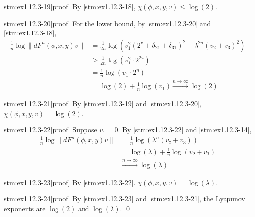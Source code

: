 \begin{stm}{stm:ex1.12.3-19}[proof]
By \ref{stm:ex1.12.3-18}, $\chi(\phi, x, y, v) \le \log(2)$.
\end{stm}

\begin{stm}{stm:ex1.12.3-20}[proof]
For the lower bound, by \ref{stm:ex1.12.3-20} and \ref{stm:ex1.12.3-18},
\begin{align*}
\frac{1}{n} \log \| dF^n(\phi, x, y)v \| 
&= \frac{1}{2n} \log \left( v_1^2(2^n + \delta_{21} + \delta_{31})^2 + \lambda^{2n}(v_2 + v_3)^2 \right) \\
&\ge \frac{1}{2n} \log \left( v_1^2 \cdot 2^{2n} \right) \\
&= \frac{1}{n} \log (v_1 \cdot 2^n) \\
&= \log(2) + \frac{1}{n} \log(v_1) \xrightarrow{n \to \infty} \log(2)
\end{align*}
\end{stm}


\begin{stm}{stm:ex1.12.3-21}[proof]
By \ref{stm:ex1.12.3-19} and \ref{stm:ex1.12.3-20}, $\chi(\phi, x, y, v) = \log(2)$.
\end{stm}

\begin{stm}{stm:ex1.12.3-22}[proof]
Suppose $v_1 = 0$. By \ref{stm:ex1.12.3-22} and \ref{stm:ex1.12.3-14},
\begin{align*}
\frac{1}{n} \log \| dF^n(\phi, x, y)v \| 
&= \frac{1}{n} \log (\lambda^n (v_2 + v_3)) \\
&= \log(\lambda) + \frac{1}{n} \log(v_2 + v_3) \\
&\xrightarrow{n \to \infty} \log(\lambda)
\end{align*}
\end{stm}

\begin{stm}{stm:ex1.12.3-23}[proof]
By \ref{stm:ex1.12.3-22}, $\chi(\phi, x, y, v) = \log(\lambda)$.
\end{stm}

\begin{stm}{stm:ex1.12.3-24}[proof]
By \ref{stm:ex1.12.3-23} and \ref{stm:ex1.12.3-21}, the Lyapunov exponents are $\log(2)$ and $\log(\lambda)$. \qed
\end{stm}
